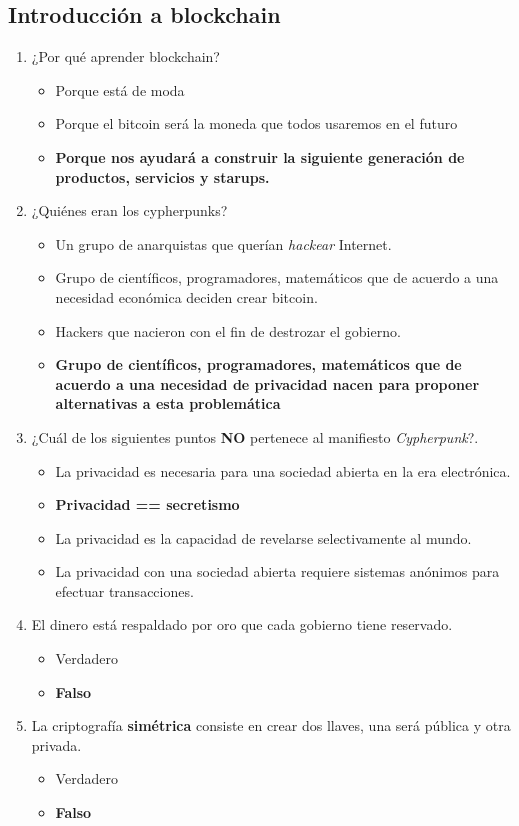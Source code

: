 \documentclass[a4paper,12pt]{/home/armando/Documentos/Cursos/LaTeX/Plantillas/lib/pub}
\begin{document}
\subsection{Introducción a blockchain}
\begin{enumerate}
	\item ¿Por qué aprender blockchain?
	\begin{itemize}
		\item Porque está de moda
		\item Porque el bitcoin será la moneda que todos usaremos en el futuro
		\item \textbf{Porque nos ayudará a construir la siguiente generación de productos, servicios y starups.}
	\end{itemize}
	\item ¿Quiénes eran los cypherpunks?
	\begin{itemize}
		\item Un grupo de anarquistas que querían \textit{hackear} Internet.
		\item Grupo de científicos, programadores, matemáticos que de acuerdo a una necesidad económica deciden crear bitcoin.
		\item Hackers que nacieron con el fin de destrozar el gobierno.
		\item \textbf{Grupo de científicos, programadores, matemáticos que de acuerdo a una necesidad de privacidad nacen para proponer alternativas a esta problemática}
	\end{itemize}
	\item ¿Cuál de los siguientes puntos \textbf{NO} pertenece al manifiesto \textit{Cypherpunk}?.
	\begin{itemize}
		\item La privacidad es necesaria para una sociedad abierta en la era electrónica.
		\item \textbf{Privacidad == secretismo}
		\item La privacidad es la capacidad de revelarse selectivamente al mundo.
		\item La privacidad con una sociedad abierta requiere sistemas anónimos para efectuar transacciones.
	\end{itemize}
	\item El dinero está respaldado por oro que cada gobierno tiene reservado.
	\begin{itemize}
		\item Verdadero
		\item \textbf{Falso}
	\end{itemize}
	\item La criptografía \textbf{simétrica} consiste en crear dos llaves, una será pública y otra privada.
	\begin{itemize}
		\item Verdadero
		\item \textbf{Falso}
	\end{itemize}
\end{enumerate}
\end{document}
